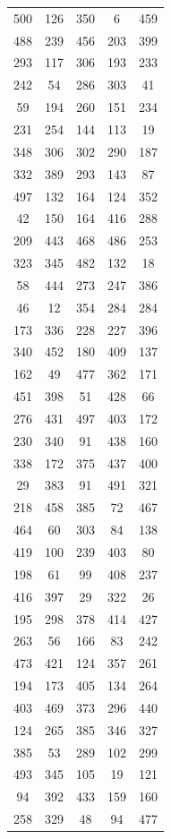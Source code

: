 \documentclass[a4paper,12pt]{article}
\begin{document}
\begin{longtable}{|c|c|c|c|c|}
  500 & 126 & 350 & 6 & 459 \\
  488 & 239 & 456 & 203 & 399 \\
  293 & 117 & 306 & 193 & 233 \\
  242 & 54 & 286 & 303 & 41 \\
  59 & 194 & 260 & 151 & 234 \\
  231 & 254 & 144 & 113 & 19 \\
  348 & 306 & 302 & 290 & 187 \\
  332 & 389 & 293 & 143 & 87 \\
  497 & 132 & 164 & 124 & 352 \\
  42 & 150 & 164 & 416 & 288 \\
  209 & 443 & 468 & 486 & 253 \\
  323 & 345 & 482 & 132 & 18 \\
  58 & 444 & 273 & 247 & 386 \\
  46 & 12 & 354 & 284 & 284 \\
  173 & 336 & 228 & 227 & 396 \\
  340 & 452 & 180 & 409 & 137 \\
  162 & 49 & 477 & 362 & 171 \\
  451 & 398 & 51 & 428 & 66 \\
  276 & 431 & 497 & 403 & 172 \\
  230 & 340 & 91 & 438 & 160 \\
  338 & 172 & 375 & 437 & 400 \\
  29 & 383 & 91 & 491 & 321 \\
  218 & 458 & 385 & 72 & 467 \\
  464 & 60 & 303 & 84 & 138 \\
  419 & 100 & 239 & 403 & 80 \\
  198 & 61 & 99 & 408 & 237 \\
  416 & 397 & 29 & 322 & 26 \\
  195 & 298 & 378 & 414 & 427 \\
  263 & 56 & 166 & 83 & 242 \\
  473 & 421 & 124 & 357 & 261 \\
  194 & 173 & 405 & 134 & 264 \\
  403 & 469 & 373 & 296 & 440 \\
  124 & 265 & 385 & 346 & 327 \\
  385 & 53 & 289 & 102 & 299 \\
  493 & 345 & 105 & 19 & 121 \\
  94 & 392 & 433 & 159 & 160 \\
  258 & 329 & 48 & 94 & 477 \\

\end{longtable}
\end{document}

